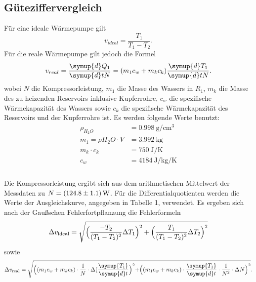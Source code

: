 \subsection{Güteziffervergleich}
Für eine ideale Wärmepumpe gilt
\begin{equation}
  v_{ideal} = \frac{T_1}{T_1-T_2}.
\end{equation}
Für die reale Wärmepumpe gilt jedoch die Formel
\begin{equation}
  v_{real}= \frac{\symup{d} Q_1}{\symup{d} tN} = (m_1c_w+m_kc_k)\frac{\symup{d} T_1}{\symup{d} tN}.
\end{equation}
wobei $ N$ die Kompressorleistung, $ m_1$ die Masse des Wassers in $ R_1 $, $m_k$ die Masse des zu heizenden Reservoirs inklusive Kupferrohre, $ c_w $ die spezifische Wärmekapazität des Wassers sowie $ c_k $ die spezifische Wärmekapazität des Reservoirs und der Kupferrohre ist.
Es werden folgende Werte benutzt:
\begin{align*}
  \rho_{H_2O} &= \SI[per-mode=fraction]{0.998}{\gram\per\centi\metre\tothe{3}} \\
  m_1 = \rho{H_2O} \cdot V &= \SI[per-mode=fraction]{3,992}{\kilogram} \\
  m_k \cdot c_k &= \SI[per-mode=fraction]{750}{\joule\per\kelvin} \\
  c_w &= \SI[per-mode=fraction]{4184}{\joule\per\kilogram\per\kelvin} \\
\end{align*}
 \cite{lecher2001taschenbuch} \\
Die Kompressorleistung ergibt sich aus dem arithmetischen Mittelwert der Messdaten zu $N=\SI{124.8+-1.1}{\watt}$.
Für die Differentialquotienten werden die Werte der Ausgleichskurve, angegeben in Tabelle 1, verwendet.
Es ergeben sich nach der Gaußschen Fehlerfortpflanzung die Fehlerformeln
\begin{equation}
  \Delta v_{\text{ideal}} = \sqrt{ \Bigl( \frac{-T_2}{(T_1-T_2)^2} \Delta T_1 \Bigr)^2 + \Bigl( \frac{T_1}{(T_1-T_2)^2} \Delta T_2 \Bigr)^2}
\end{equation}
sowie
\begin{equation}
  \Delta v_{\text{real}} = \sqrt{ \Bigl( (m_1 c_w + m_k c_k) \cdot \frac{1}{N} \cdot\Delta(\frac{\symup{T_1}}{\symup{d}t}   \Bigr)^2 + \Bigr( (m_1 c_w + m_k c_k) \cdot \frac{\symup{T_1}}{\symup{d}t} \cdot \frac{1}{N^2} \cdot \Delta N  \Bigl)^2 } .
\end{equation}
